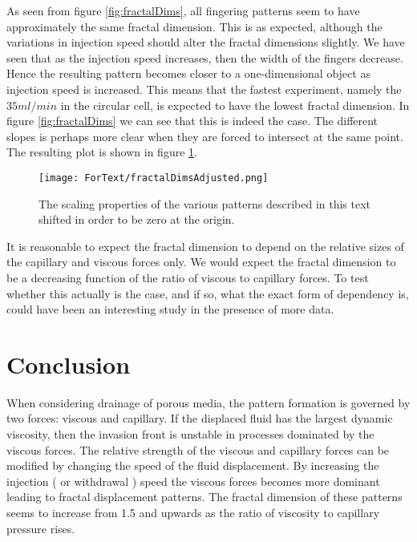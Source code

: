 \documentclass[twoside,utf8]{article}
\begin{document}
\noindent
As seen from figure \ref{fig:fractalDims}, all fingering patterns seem to have approximately the same fractal dimension. This is as expected, although the variations in injection speed should alter the fractal dimensions slightly. We have seen that as the injection speed increases, then the width of the fingers decrease. Hence the resulting pattern becomes closer to a one-dimensional object as injection speed is increased. This means that the fastest experiment, namely the $35ml/min$ in the circular cell, is expected to have the lowest fractal dimension. In figure \ref{fig:fractalDims} we can see that this is indeed the case.
The different slopes is perhaps more clear when they are forced to intersect at the same point. The resulting plot is shown in figure \ref{fig:fractalDims2}.

\begin{figure}[H]
	\begin{center}
	\texttt{[image: ForText/fractalDimsAdjusted.png]}
	\end{center}
	\caption{The scaling properties of the various patterns described in this text shifted in order to be zero at the origin. }
	\label{fig:fractalDims2}
\end{figure}


\noindent
It is reasonable to expect the fractal dimension to depend on the relative sizes of the capillary and viscous forces only. We would expect the fractal dimension to be a decreasing function of the ratio of viscous to capillary forces. To test whether this actually is the case, and if so, what the exact form of dependency is, could have been an interesting study in the presence of more data.










\section{Conclusion}
When considering drainage of porous media, the pattern formation is governed by two forces: viscous and capillary. If the displaced fluid has the largest dynamic viscosity, then the invasion front is unstable in processes dominated by the viscous forces. The relative strength of the viscous and capillary forces can be modified by changing the speed of the fluid displacement. By increasing the injection ( or withdrawal ) speed the viscous forces becomes more dominant leading to fractal displacement patterns. The fractal dimension of these patterns seems to increase from 1.5 and upwards as the ratio of viscosity to capillary pressure rises.
\end{document}
